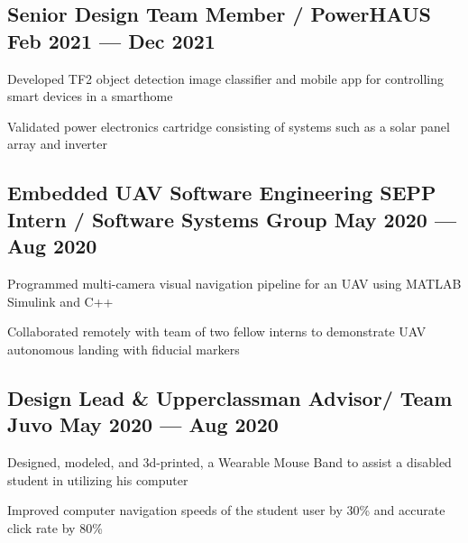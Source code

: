 \subsection{{Senior Design Team Member / PowerHAUS \hfill Feb 2021 --- Dec 2021}}
\begin{zitemize}
	\item Developed TF2 object detection image classifier and mobile app for controlling smart devices in a smarthome
	\item Validated power electronics cartridge consisting of systems such as a solar panel array and inverter
\end{zitemize}


\subsection{{Embedded UAV Software Engineering SEPP Intern / Software Systems Group  \hfill May 2020 --- Aug 2020}}
\begin{zitemize}
	\item Programmed multi-camera visual navigation pipeline for an UAV using MATLAB Simulink and C++
	\item Collaborated remotely with team of two fellow interns to demonstrate UAV autonomous landing with fiducial
	markers
\end{zitemize}

\subsection{{Design Lead & Upperclassman Advisor/ Team Juvo  \hfill May 2020 --- Aug 2020}}
\begin{zitemize}
	\item Designed, modeled, and 3d-printed, a Wearable Mouse Band to assist a disabled student in utilizing his computer
	\item Improved computer navigation speeds of the student user by 30\% and accurate click rate by 80\%
\end{zitemize}

